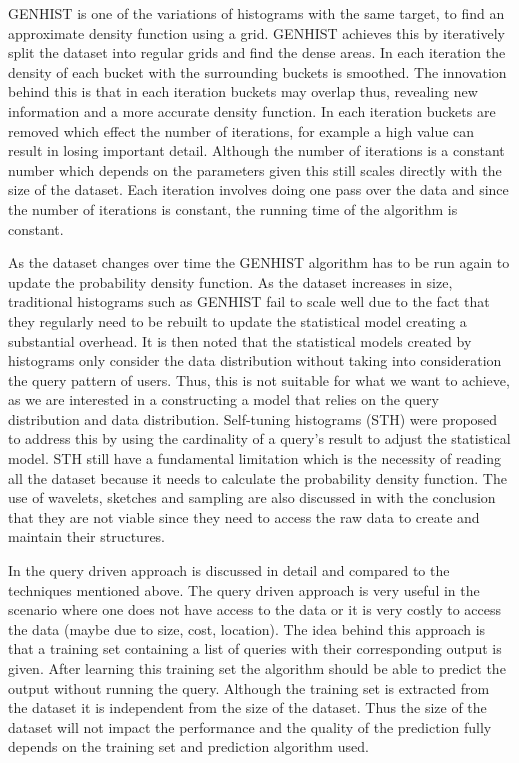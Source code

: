 \documentclass{lmproj}
\begin{document}
GENHIST\cite{Genhist} is one of the variations of histograms with the same target, to find an approximate density function using a grid. GENHIST achieves this by iteratively split the dataset into regular grids and find the dense areas. In each iteration the density of each bucket with the surrounding buckets is smoothed. The innovation behind this is that in each iteration buckets may overlap thus, revealing new information and a more accurate density function. In each iteration buckets are removed which effect the number of iterations, for example a high value can result in losing important detail. Although the number of iterations is a constant number which depends on the parameters given this still scales directly with the size of the dataset. Each iteration involves doing one pass over the data and since the number of iterations is constant, the running time of the algorithm is constant.\cite{Genhist}

As the dataset changes over time the GENHIST algorithm has to be run again to update the probability density function. As the dataset increases in size, traditional histograms such as GENHIST fail to scale well due to the fact that they regularly need to be rebuilt to update the statistical model creating a substantial overhead. It is then noted that the statistical models created by histograms only consider the data distribution without taking into consideration the query pattern of users.\cite{learningCount} Thus, this is not suitable for what we want to achieve, as we are interested in a constructing a model that relies on the query distribution and data distribution. Self-tuning histograms (STH) were proposed to address this by using the cardinality of a query's result to adjust the statistical model. STH still have a fundamental limitation which is the necessity of reading all the dataset because it needs to calculate the probability density function. The use of wavelets, sketches and sampling are also discussed in \cite{learningCount} with the conclusion that they are not viable since they need to access the raw data to create and maintain their structures.

In \cite{learningCount} the query driven approach is discussed in detail and compared to the techniques mentioned above. The query driven approach is very useful in the scenario where one does not have access to the data or it is very costly to access the data (maybe due to size, cost, location). The idea behind this approach is that a training set containing a list of queries with their corresponding output is given. After learning this training set the algorithm should be able to predict the output without running the query. Although the training set is extracted from the dataset it is independent from the size of the dataset. Thus the size of the dataset will not impact the performance and the quality of the prediction fully depends on the training set and prediction algorithm used.
\end{document}
